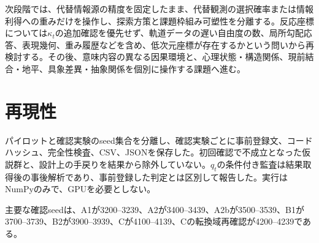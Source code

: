 \documentclass[11pt,a4paper]{ltjsarticle}
\begin{document}
次段階では、代替情報源の精度を固定したまま、代替観測の選択確率または情報利得への重みだけを操作し、探索方策と課題枠組み可塑性を分離する。反応座標については$\kappa_t$の追加確認を優先せず、軌道データの遅い自由度の数、局所勾配応答、表現幾何、重み履歴などを含め、低次元座標が存在するかという問いから再検討する。その後、意味内容の異なる因果環境と、心理状態・構造関係、現前結合・地平、具象差異・抽象関係を個別に操作する課題へ進む。

\section{再現性}

パイロットと確認実験のseed集合を分離し、確認実験ごとに事前登録文、コードハッシュ、完全性検査、CSV、JSONを保存した。初回確認で不成立となった仮説群と、設計上の手戻りを結果から除外していない。$q_t$の条件付き監査は結果取得後の事後解析であり、事前登録した判定とは区別して報告した。実行はNumPyのみで、GPUを必要としない。

主要な確認seedは、A1が3200--3239、A2が3400--3439、A2bが3500--3539、B1が3700--3739、B2が3900--3939、Cが4100--4139、Cの転換域再確認が4200--4239である。
\end{document}

